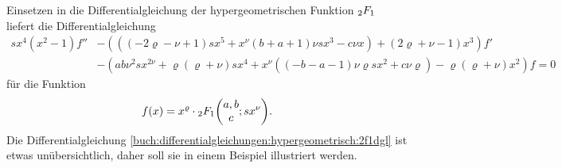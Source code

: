 Einsetzen in die Differentialgleichung der hypergeometrischen Funktion
$\mathstrut_2F_1$ liefert die Differentialgleichung
\begin{equation}
\begin{aligned}
sx^4(x^2-1) f''
&-(
	((-2\varrho-\nu+1) s x^5 +x^\nu(b+a+1)\nu s x^3-c\nu x)
	+
	(2\varrho+\nu-1)x^3
)f'
\\
&-(
	ab\nu^2 sx^{2\nu}
	+ \varrho(\varrho+\nu)sx^4
	+ x^\nu((-b-a-1)\nu\varrho s x^2 + c\nu\varrho)
	- \varrho(\varrho+\nu)x^2
)f
=0
\end{aligned}
\label{buch:differentialgleichungen:hypergeometrisch:2f1dgl}
\end{equation}
für die Funktion
\[
f(x)=x^\varrho \cdot\mathstrut_2F_1\biggl(
\begin{matrix}a,b\\c\end{matrix}; sx^\nu
\biggr).
\]
Die Differentialgleichung
\eqref{buch:differentialgleichungen:hypergeometrisch:2f1dgl}
ist etwas unübersichtlich, daher soll sie in einem Beispiel illustriert
werden.

